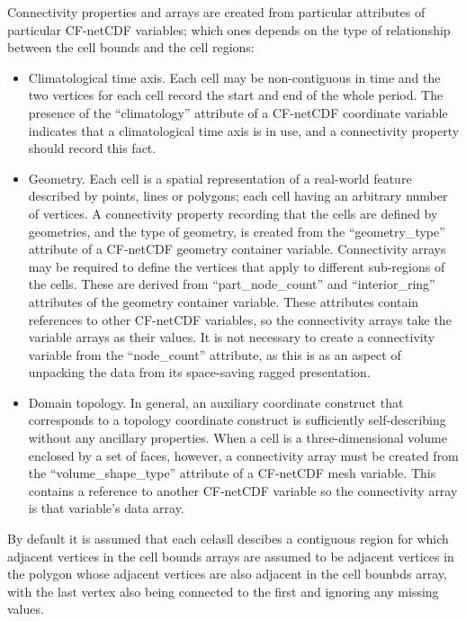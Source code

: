 Connectivity properties and arrays are created from particular
attributes of particular CF-netCDF variables; which ones depends on
the type of relationship between the cell bounds and the cell regions:

\begin{itemize}

\item Climatological time axis. Each cell may be non-contiguous in
  time and the two vertices for each cell record the start and end of
  the whole period. The presence of the ``climatology'' attribute of a
  CF-netCDF coordinate variable indicates that a climatological time
  axis is in use, and a connectivity property should record this fact.
  
\item Geometry. Each cell is a spatial representation of a real-world
  feature described by points, lines or polygons; each cell having an
  arbitrary number of vertices. A connectivity property recording that
  the cells are defined by geometries, and the type of geometry, is
  created from the ``geometry\_type'' attribute of a CF-netCDF
  geometry container variable. Connectivity arrays may be required to
  define the vertices that apply to different sub-regions of the
  cells. These are derived from ``part\_node\_count'' and
  ``interior\_ring'' attributes of the geometry container
  variable. These attributes contain references to other CF-netCDF
  variables, so the connectivity arrays take the variable arrays as
  their values. It is not necessary to create a connectivity variable
  from the ``node\_count'' attribute, as this is as an aspect of
  unpacking the data from its space-saving ragged presentation.

\item Domain topology. In general, an auxiliary coordinate construct
  that corresponds to a topology coordinate construct is sufficiently
  self-describing without any ancillary properties. When a cell is a
  three-dimensional volume enclosed by a set of faces, however, a
  connectivity array must be created from the ``volume\_shape\_type''
  attribute of a CF-netCDF mesh variable. This contains a reference to
  another CF-netCDF variable so the connectivity array is that
  variable's data array.
  
\end{itemize}



By default it is assumed that each celasll descibes a contiguous region
for which adjacent vertices in the cell bounds arrays are assumed to
be adjacent vertices in the polygon whose adjacent vertices are also adjacent in the
cell bounbds array, with the last vertex also being connected to the
first and ignoring any missing values.

